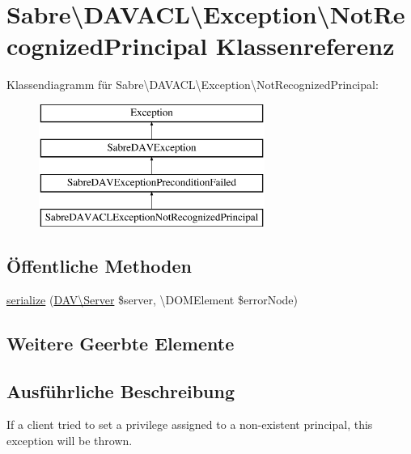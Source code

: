 \hypertarget{class_sabre_1_1_d_a_v_a_c_l_1_1_exception_1_1_not_recognized_principal}{}\section{Sabre\textbackslash{}D\+A\+V\+A\+CL\textbackslash{}Exception\textbackslash{}Not\+Recognized\+Principal Klassenreferenz}
\label{class_sabre_1_1_d_a_v_a_c_l_1_1_exception_1_1_not_recognized_principal}
Klassendiagramm für Sabre\textbackslash{}D\+A\+V\+A\+CL\textbackslash{}Exception\textbackslash{}Not\+Recognized\+Principal\+:\begin{figure}[H]
\begin{center}
\leavevmode
\includegraphics[height=4.000000cm]{class_sabre_1_1_d_a_v_a_c_l_1_1_exception_1_1_not_recognized_principal}
\end{center}
\end{figure}
\subsection*{Öffentliche Methoden}
\begin{DoxyCompactItemize}
\item 
\mbox{\hyperlink{class_sabre_1_1_d_a_v_a_c_l_1_1_exception_1_1_not_recognized_principal_afb210da3dcd2c86f0702a03ba983cd44}{serialize}} (\mbox{\hyperlink{class_sabre_1_1_d_a_v_1_1_server}{D\+A\+V\textbackslash{}\+Server}} \$server, \textbackslash{}D\+O\+M\+Element \$error\+Node)
\end{DoxyCompactItemize}
\subsection*{Weitere Geerbte Elemente}


\subsection{Ausführliche Beschreibung}
If a client tried to set a privilege assigned to a non-\/existent principal, this exception will be thrown.

